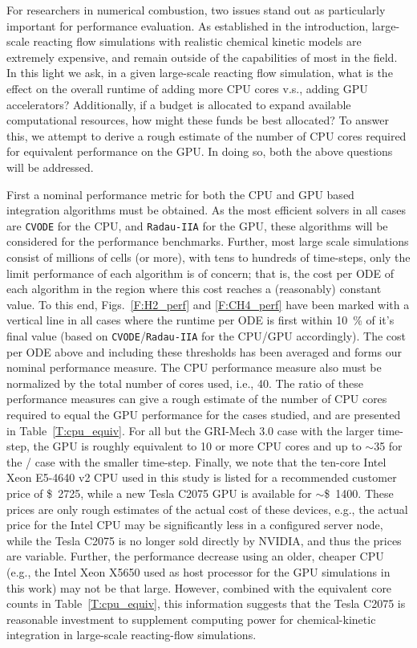 \documentclass[final,twocolumn]{elsarticle}
\begin{document}
For researchers in numerical combustion, two issues stand out as particularly important for performance evaluation.
As established in the introduction, large-scale reacting flow simulations with realistic chemical kinetic models are extremely expensive, and remain outside of the capabilities of most in the field.
In this light we ask, in a given large-scale reacting flow simulation, what is the effect on the overall runtime of adding more CPU cores v.s., adding GPU accelerators?
Additionally, if a budget is allocated to expand available computational resources, how might these funds be best allocated?
To answer this, we attempt to derive a rough estimate of the number of CPU cores required for equivalent performance on the GPU.
In doing so, both the above questions will be addressed.

First a nominal performance metric for both the CPU and GPU based integration algorithms must be obtained.
As the most efficient solvers in all cases are \texttt{CVODE} for the CPU, and \texttt{Radau-IIA} for the GPU, these algorithms will be considered for the performance benchmarks.
Further, most large scale simulations consist of millions of cells (or more), with tens to hundreds of time-steps, only the limit performance of each algorithm is of concern; that is, the cost per ODE of each algorithm in the region where this cost reaches a (reasonably) constant value.
To this end, Figs.~\ref{F:H2_perf} and \ref{F:CH4_perf} have been marked with a vertical line in all cases where the runtime per ODE is first within \SI{10}{\percent} of it's final value (based on \texttt{CVODE}\slash\texttt{Radau-IIA} for the CPU\slash GPU accordingly).
The cost per ODE above and including these thresholds has been averaged and forms our nominal performance measure.
The CPU performance measure also must be normalized by the total number of cores used, i.e., \num{40}.
The ratio of these performance measures can give a rough estimate of the number of CPU cores required to equal the GPU performance for the cases studied, and are presented in Table~\ref{T:cpu_equiv}.
For all but the GRI-Mech 3.0 case with the larger time-step, the GPU is roughly equivalent to \num{10} or more CPU cores and up to $\sim$\num{35} for the \slash{} case with the smaller time-step.
Finally, we note that the ten-core Intel Xeon E5-4640 v2 CPU used in this study is listed for a recommended customer price of \SI{2725}[\$]{}, while a new Tesla C2075 GPU is available for $\sim$\SI{1400}[\$]{}.
These prices are only rough estimates of the actual cost of these devices, e.g., the actual price for the Intel CPU may be significantly less in a configured server node, while the Tesla C2075 is no longer sold directly by NVIDIA, and thus the prices are variable.
Further, the performance decrease using an older, cheaper CPU (e.g., the Intel Xeon X5650 used as host processor for the GPU simulations in this work) may not be that large.
However, combined with the equivalent core counts in Table~\ref{T:cpu_equiv}, this information suggests that the Tesla C2075 is reasonable investment to supplement computing power for chemical-kinetic integration in large-scale reacting-flow simulations.
\end{document}
